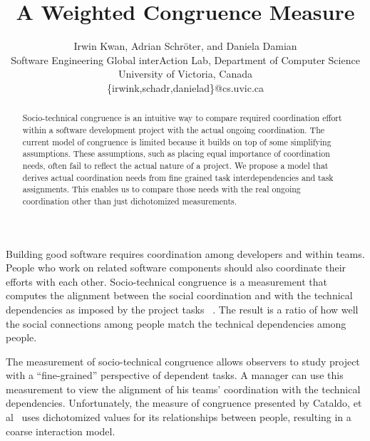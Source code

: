 \documentclass[times, 10pt,twocolumn]{article}
\begin{document}
\title{A Weighted Congruence Measure}

\author{Irwin Kwan, Adrian Schr{\"o}ter, and Daniela Damian\\
Software Engineering Global interAction Lab, Department of Computer Science\\
University of Victoria, Canada\\ 
\{irwink,schadr,danielad\}@cs.uvic.ca\\
}

\maketitle
\thispagestyle{empty}

\begin{abstract}
Socio-technical congruence is an intuitive way to compare required coordination effort within a software development project with the actual ongoing coordination.
The current model of congruence is limited because it builds on top of some simplifying assumptions.
These assumptions, such as placing equal importance of coordination needs, often fail to reflect the actual nature of a project.
We propose a model that derives actual coordination needs from fine grained task interdependencies and task assignments.
This enables us to compare those needs with the real ongoing coordination other than just dichotomized measurements.
\end{abstract}



Building good software requires coordination among developers and within teams. 
People who work on related software components should also coordinate their efforts with each other. 
Socio-technical congruence is a measurement that computes the alignment between the social coordination and with the technical dependencies as imposed by the project tasks ~\cite{cataldo2006:coordination_reqs}. 
The result is a ratio of how well the social connections among people match the technical dependencies among people.

The measurement of socio-technical congruence allows observers to study project with a ``fine-grained'' perspective of dependent tasks.
A manager can use this measurement to view the alignment of his teams' coordination with the technical dependencies. 
Unfortunately, the measure of congruence presented by Cataldo, et al~\cite{cataldo2006:coordination_reqs} uses dichotomized values for its relationships between people, resulting in a coarse interaction model.
\end{document}

